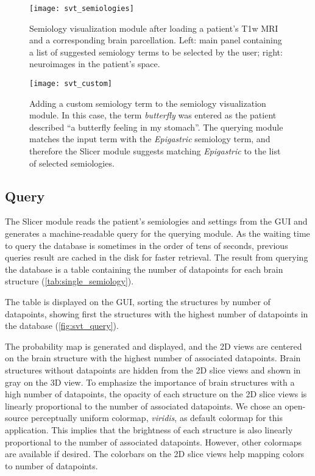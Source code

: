 \begin{figure}
  \centering
  \texttt{[image: svt\_semiologies]}
  \caption[Semiology visualization module after loading a patient's data]{
    Semiology visualization module after loading a patient's \ac{T1w} \ac{MRI} and a corresponding brain parcellation.
    Left: main panel containing a list of suggested semiology terms to be selected by the user;
    right: neuroimages in the patient's space.
  }
  \label{fig:svt_loaded}
\end{figure}

\begin{figure}
  \centering
  \texttt{[image: svt\_custom]}
  \caption[Adding a custom semiology term to the semiology visualization module]{
    Adding a custom semiology term to the semiology visualization module.
    In this case, the term \textit{butterfly} was entered as the patient described ``a butterfly feeling in my stomach''.
    The querying module matches the input term with the \textit{Epigastric} semiology term, and therefore the Slicer module suggests matching \textit{Epigastric} to the list of selected semiologies.
  }
  \label{fig:svt_custom}
\end{figure}


\subsection{Query}

The Slicer module reads the patient's semiologies and settings from the \ac{GUI} and generates a machine-readable query for the querying module.
As the waiting time to query the database is sometimes in the order of tens of seconds, previous queries result are cached in the disk for faster retrieval.
The result from querying the database is a table containing the number of datapoints for each brain structure (\cref{tab:single_semiology}).

The table is displayed on the \ac{GUI}, sorting the structures by number of datapoints, showing first the structures with the highest number of datapoints in the database (\cref{fig:svt_query}).

The probability map is generated and displayed, and the 2D views are centered on the brain structure with the highest number of associated datapoints.
Brain structures without datapoints are hidden from the 2D slice views and shown in gray on the 3D view.
To emphasize the importance of brain structures with a high number of datapoints, the opacity of each structure on the 2D slice views is linearly proportional to the number of associated datapoints.
We chose an open-source perceptually uniform colormap, \textit{viridis}, as default colormap for this application.
This implies that the brightness of each structure is also linearly proportional to the number of associated datapoints.
However, other colormaps are available if desired.
The colorbars on the 2D slice views help mapping colors to number of datapoints.

